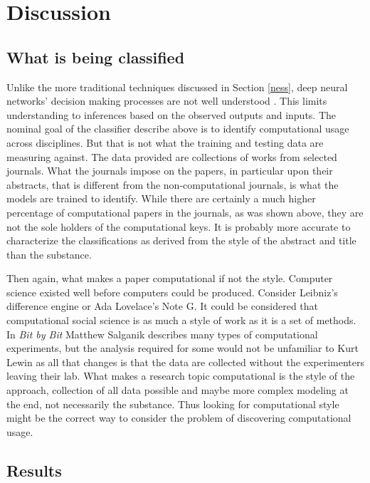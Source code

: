 \documentclass[12pt, a4paper]{article}
\begin{document}
\section{Discussion}

\subsection{What is being classified}

Unlike the more traditional techniques discussed in Section \ref{ness}, deep neural networks' decision making processes are not well understood \citep{deep_learning_chapter12}. This limits understanding to inferences based on the observed outputs and inputs. The nominal goal of the classifier describe above is to identify computational usage across disciplines. But that is not what the training and testing data are measuring against. The data provided are collections of works from selected journals. What the journals impose on the papers, in particular upon their abstracts, that is different from the non-computational journals, is what the models are trained to identify. While there are certainly a much higher percentage of computational papers in the journals, as was shown above, they are not the sole holders of the computational keys. It is probably more accurate to characterize the classifications as derived from the style of the abstract and title than the substance.

Then again, what makes a paper computational if not the style. Computer science existed well before computers could be produced. Consider Leibniz's difference engine or Ada Lovelace's Note G. It could be considered that computational social science is as much a style of work as it is a set of methods. In \textit{Bit by Bit} Matthew Salganik \citep{salganik2017bit} describes many types of computational experiments, but the analysis required for some would not be unfamiliar to Kurt Lewin \citep{lewin1939field} as all that changes is that the data are collected without the experimenters leaving their lab. What makes a research topic computational is the style of the approach, collection of all data possible and maybe more complex modeling at the end, not necessarily the substance. Thus looking for computational style might be the correct way to consider the problem of discovering computational usage.

\subsection{Results}
\end{document}
